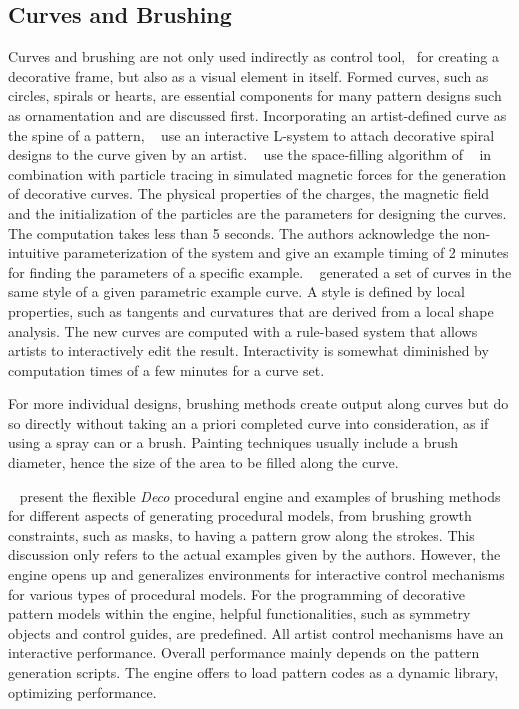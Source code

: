 \subsection{Curves and Brushing}
\label{subsec:analysis_curves}

Curves and brushing are not only used indirectly as control tool, \eg~for creating a decorative frame, but also as a visual element in itself. Formed curves, such as circles, spirals or hearts, are essential components for many pattern designs such as ornamentation and are discussed first. Incorporating an artist-defined curve as the spine of a pattern, \citeauthor*{yu_2012_ans}~\cite{yu_2012_ans} use an interactive L-system to attach decorative spiral designs to the curve given by an artist. \citeauthor*{xu_2009_mcc}~\cite{xu_2009_mcc} use the space-filling algorithm of \citeauthor*{wong_1998_cgf}~\cite{wong_1998_cgf} in combination with particle tracing in simulated magnetic forces for the generation of decorative curves. The physical properties of the charges, the magnetic field and the initialization of the particles are the parameters for designing the curves. The computation takes less than 5 seconds. The authors acknowledge the non-intuitive parameterization of the system and give an example timing of 2 minutes for finding the parameters of a specific example. \citeauthor*{merrell_2010_ecs}~\cite{merrell_2010_ecs} generated a set of curves in the same style of a given parametric example curve. A style is defined by local properties, such as tangents and curvatures that are derived from a local shape analysis. The new curves are computed with a rule-based system that allows artists to interactively edit the result. Interactivity is somewhat diminished by computation times of a few minutes for a curve set.

For more individual designs, brushing methods create output along curves but do so directly without taking an a priori completed curve into consideration, as if using a spray can or a brush. Painting techniques usually include a brush diameter, hence the size of the area to be filled along the curve. 

\citeauthor*{mech_2012_tdf}~\cite{mech_2012_tdf} present the flexible \textit{Deco} procedural engine and examples of brushing methods for different aspects of generating procedural models, from brushing growth constraints, such as masks, to having a pattern grow along the strokes. This discussion only refers to the actual examples given by the authors. However, the engine opens up and generalizes environments for interactive control mechanisms for various types of procedural models. For the programming of decorative pattern models within the engine, helpful functionalities, such as symmetry objects and control guides, are predefined. All artist control mechanisms have an interactive performance. Overall performance mainly depends on the pattern generation scripts. The engine offers to load pattern codes as a dynamic library, optimizing performance. 


